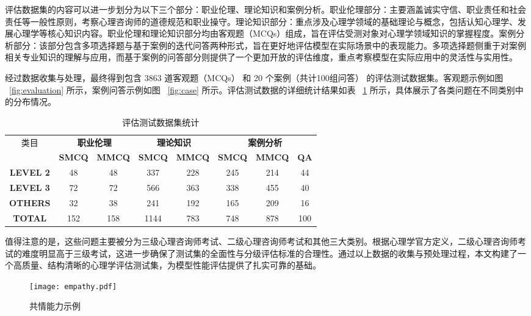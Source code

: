 评估数据集的内容可以进一步划分为以下三个部分：职业伦理、理论知识和案例分析。职业伦理部分：主要涵盖诚实守信、职业责任和社会责任等一般性原则，考察心理咨询师的道德规范和职业操守。理论知识部分：重点涉及心理学领域的基础理论与概念，包括认知心理学、发展心理学等核心知识内容。职业伦理和理论知识部分均由客观题（MCQs）组成，旨在评估受测对象对心理学领域知识的掌握程度。案例分析部分：该部分包含多项选择题与基于案例的迭代问答两种形式，旨在更好地评估模型在实际场景中的表现能力。多项选择题侧重于对案例相关专业知识的理解与应用，而基于案例的问答部分则提供了一个更加开放的评估维度，重点考察模型在实际应用中的灵活性与实用性。

经过数据收集与处理，最终得到包含 3863 道客观题（MCQs） 和 20 个案例（共计100组问答） 的评估测试数据集。客观题示例如图 ~\ref{fig:evaluation} 所示，案例问答示例如图 ~\ref{fig:case} 所示。评估测试数据的详细统计结果如表 ~\ref{benchmark-statistics} 所示，具体展示了各类问题在不同类别中的分布情况。

\begin{table}[h]
  \centering
  \caption{评估测试数据集统计}
  \label{benchmark-statistics}
  \begin{tabular}{c|cc|cc|ccc}
      \toprule
      类目 & \multicolumn{2}{c|}{\textbf{职业伦理}} & \multicolumn{2}{c|}{\textbf{理论知识}} & \multicolumn{3}{c}{\textbf{案例分析}} \\
      & \textbf{SMCQ} & \textbf{MMCQ} & \textbf{SMCQ} & \textbf{MMCQ} & \textbf{SMCQ} & \textbf{MMCQ} & \textbf{QA} \\
      \midrule
      \textbf{LEVEL 2} & 48 & 48 & 337 & 228 & 245 & 214 & 44 \\
      \textbf{LEVEL 3} & 72 & 72 & 566 & 363 & 338 & 455 & 40 \\
      \textbf{OTHERS} & 32 & 38 & 241 & 192 & 165 & 209 & 16 \\
      \midrule
      \textbf{TOTAL} & 152 & 158 & 1144 & 783 & 748 & 878 & 100 \\
      \bottomrule
  \end{tabular}
\end{table}


值得注意的是，这些问题主要被分为三级心理咨询师考试、二级心理咨询师考试和其他三大类别。根据心理学官方定义，二级心理咨询师考试的难度明显高于三级考试，这进一步确保了测试集的全面性与分级评估标准的合理性。通过以上数据的收集与预处理过程，本文构建了一个高质量、结构清晰的心理学评估测试集，为模型性能评估提供了扎实可靠的基础。

\begin{figure}[ht]
  \centering
  \texttt{[image: empathy.pdf]}
  \caption{共情能力示例}
  \label{fig:empathy}
\end{figure}

